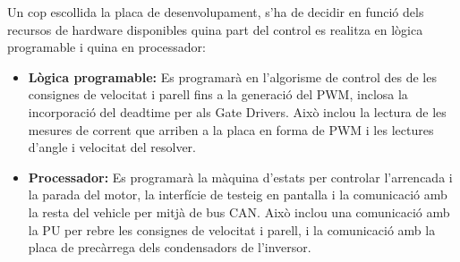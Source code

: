 {    Un cop escollida la placa de desenvolupament, s'ha de decidir en funció
    dels recursos de hardware disponibles quina part del control es realitza en
    lògica programable i quina en processador:

    \begin{itemize}
        \item \textbf{Lògica programable:} 
            Es programarà en l'algorisme de control des de les consignes de
            velocitat i parell fins a la generació del PWM, inclosa la
            incorporació del deadtime per als Gate Drivers. Això inclou la
            lectura de les mesures de corrent que arriben a la placa en forma
            de PWM i les lectures d'angle i velocitat del resolver.

        \item \textbf{Processador:}
            Es programarà la màquina d'estats per controlar l'arrencada i la
            parada del motor, la interfície de testeig en pantalla i la
            comunicació amb la resta del vehicle per mitjà de bus CAN. Això
            inclou una comunicació amb la PU per rebre les consignes de
            velocitat i parell, i la comunicació amb la placa de precàrrega
            dels condensadors de l'inversor.

    \end{itemize}
}

